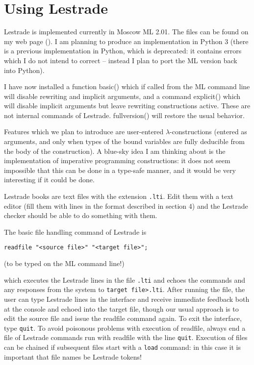 \documentclass[12pt]{article}
\begin{document}
\section{Using Lestrade}

Lestrade is implemented currently in Moscow ML 2.01.  The files can be found on my web page (\cite{holmessource}).  I am planning to produce an implementation in Python 3 (there is a previous implementation in Python, which is deprecated:  it contains errors which I do not intend to correct -- instead I plan to port the ML version back into Python).  

I have now installed a function basic() which if called from the ML command line will disable rewriting and implicit arguments, and a command explicit() which will disable implicit arguments but leave rewriting constructions active.  These are not internal commands of Lestrade.  fullversion() will restore the usual behavior.

Features which we plan to introduce are user-entered $\lambda$-constructions (entered as arguments, and only when types of the bound variables are fully deducible from the body of the construction).  A blue-sky idea I am thinking about is the implementation of imperative programming constructions:  it does not seem impossible that this can be done in a type-safe manner, and it would be very interesting if it could be done.

Lestrade books are text files with the extension {\tt .lti}.  Edit them with a text editor (fill them with lines in the format described in section 4) and the Lestrade checker should be able to do  something with them.

The basic file handling command of Lestrade is

{\tt readfile "<source file>" "<target file>";}

(to be typed on the ML command line!)

which executes the Lestrade lines in the file {\tt <source file>.lti} and echoes the commands and any responses from the system to {\tt target file>.lti}.  After running the file,
the user can type Lestrade lines in the interface and receive immediate feedback both at the console and echoed into the target file, though our usual approach is to edit the source file
and issue the readfile command again.  To exit the interface, type {\tt quit}.  To avoid poisonous problems with execution of readfile, always end a file of Lestrade commands
run with readfile with the line {\tt quit}.  Execution of files can be chained if subsequent files start with a {\tt load} command:  in this case it is important that file names be Lestrade tokens!
\end{document}
